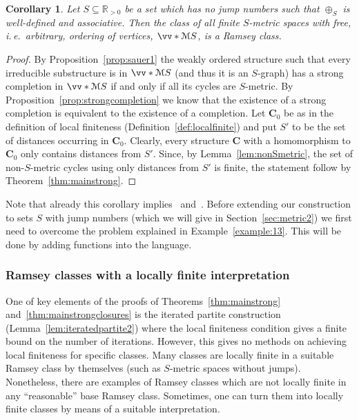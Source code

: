 \documentclass{elsarticle}
\newcommand{\ie}{i.\,e.}
\def\ordclasssup#1#2{\vv*{#1}{#2}}
\def\str#1{\mathbf {#1}}
\theoremstyle{plain}
\newtheorem{corollary}[theorem]{Corollary}
\theoremstyle{definition}
\theoremstyle{remark}
\begin{document}
\begin{corollary}
\label{cor:finite4value}
Let $S\subseteq \mathbb R_{>0}$ be a set which has no jump numbers such that $\oplus_S$ is well-defined and associative. Then the class of all finite $S$-metric
spaces with free, \ie{}\ arbitrary, ordering of vertices, $\ordclasssup{\mathcal M}{S}$, is a
Ramsey class.
\end{corollary}

\begin{proof}
By Proposition~\ref{prop:sauer1} the weakly ordered structure such that every irreducible substructure is in $\ordclasssup{\mathcal M}{S}$ (and thus it is an $S$-graph) has a strong completion in
$\ordclasssup{\mathcal M}{S}$ if and only if all its cycles are $S$-metric.
By Proposition~\ref{prop:strongcompletion} we know that the existence of a strong completion is equivalent to the existence of a completion. Let $\str C_0$ be as in the definition of local finiteness (Definition~\ref{def:localfinite}) and put $S'$ to be the set of distances occurring in $\str C_0$. Clearly, every structure $\str C$ with a homomorphism to $\str C_0$ only contains distances from $S'$. Since, by Lemma~\ref{lem:nonSmetric}, the set of non-$S$-metric cycles using only distances from $S'$ is finite, the statement follow by Theorem~\ref{thm:mainstrong}.
\end{proof}
Note that already this corollary implies~\cite{Nevsetvril2007} and~\cite{Dellamonica2012}.
Before extending our construction to sets $S$ with jump numbers (which we will give in Section~\ref{sec:metric2}) we first need to overcome the problem explained in Example~\ref{example:13}. This will be done by adding functions into the language.

\subsubsection {Ramsey classes with a locally finite interpretation}
\label{sec:imaginaries}
One of key elements of the proofs of Theorems~\ref{thm:mainstrong} and~\ref{thm:mainstrongclosures} is the iterated partite
construction (Lemma~\ref{lem:iteratedpartite2}) where the local finiteness condition
gives a finite bound on the number of iterations.
However, this gives no methods on achieving local finiteness for specific classes.
Many classes are locally finite in a suitable Ramsey class by themselves (such as $S$-metric spaces without jumps). Nonetheless, there are examples of Ramsey classes which are not locally finite in any ``reasonable'' base Ramsey class. Sometimes, one can turn them into locally finite classes by means of a suitable interpretation.
\end{document}
